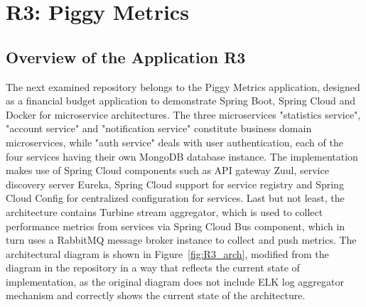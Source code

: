 \documentclass{Configuration_Files/PoliMi3i_thesis}
\begin{document}
\section{R3: Piggy Metrics}
\label{sec:R3}

\subsection{Overview of the Application R3}
\label{subsec:R3_overview}

The next examined repository belongs to the Piggy Metrics application, designed as a financial budget application to demonstrate Spring Boot, Spring Cloud and Docker for microservice architectures.
The three microservices "statistics service", "account service" and "notification service" constitute business domain microservices, while "auth service" deals with user authentication, each of the four services having their own MongoDB database instance.
The implementation makes use of Spring Cloud components such as API gateway Zuul\footnotemark[76], service discovery server Eureka, Spring Cloud support for service registry and Spring Cloud Config\footnotemark[77] for centralized configuration for services.
Last but not least, the architecture contains Turbine stream aggregator\footnotemark[78], which is used to collect performance metrics from services via Spring Cloud Bus\footnotemark[79] component, which in turn uses a RabbitMQ message broker instance to collect and push metrics.
The architectural diagram is shown in Figure~\ref{fig:R3_arch}, modified from the diagram in the repository in a way that reflects the current state of implementation, as the original diagram does not include ELK log aggregator mechanism and correctly shows the current state of the architecture.
\end{document}
